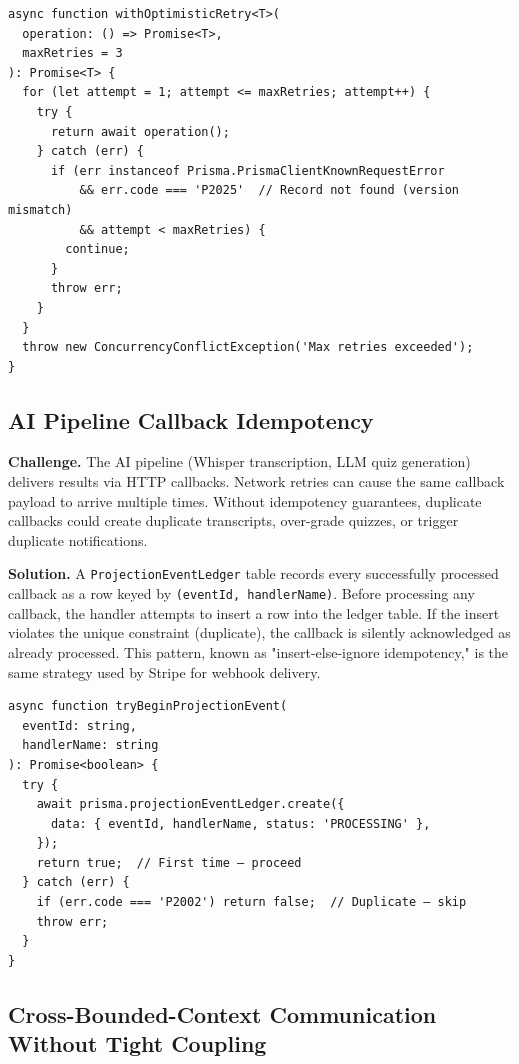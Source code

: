 \begin{lstlisting}[caption=Optimistic concurrency retry utility,label=lst:optimistic-retry]
async function withOptimisticRetry<T>(
  operation: () => Promise<T>,
  maxRetries = 3
): Promise<T> {
  for (let attempt = 1; attempt <= maxRetries; attempt++) {
    try {
      return await operation();
    } catch (err) {
      if (err instanceof Prisma.PrismaClientKnownRequestError
          && err.code === 'P2025'  // Record not found (version mismatch)
          && attempt < maxRetries) {
        continue;
      }
      throw err;
    }
  }
  throw new ConcurrencyConflictException('Max retries exceeded');
}
\end{lstlisting}

\subsection{AI Pipeline Callback Idempotency}

\textbf{Challenge.} The AI pipeline (Whisper transcription, LLM quiz generation) delivers results via HTTP callbacks. Network retries can cause the same callback payload to arrive multiple times. Without idempotency guarantees, duplicate callbacks could create duplicate transcripts, over-grade quizzes, or trigger duplicate notifications.

\textbf{Solution.} A \texttt{ProjectionEventLedger} table records every successfully processed callback as a row keyed by \texttt{(eventId, handlerName)}. Before processing any callback, the handler attempts to insert a row into the ledger table. If the insert violates the unique constraint (duplicate), the callback is silently acknowledged as already processed. This pattern, known as "insert-else-ignore idempotency," is the same strategy used by Stripe for webhook delivery.

\begin{lstlisting}[caption={Projection event ledger for idempotent callback processing},label=lst:proj-ledger]
async function tryBeginProjectionEvent(
  eventId: string,
  handlerName: string
): Promise<boolean> {
  try {
    await prisma.projectionEventLedger.create({
      data: { eventId, handlerName, status: 'PROCESSING' },
    });
    return true;  // First time — proceed
  } catch (err) {
    if (err.code === 'P2002') return false;  // Duplicate — skip
    throw err;
  }
}
\end{lstlisting}

\subsection{Cross-Bounded-Context Communication Without Tight Coupling}

